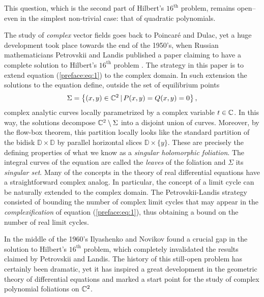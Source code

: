 \documentclass[phd,tocprelim]{cornell}
\begin{document}
\noindent This question, which is the second part of Hilbert's $16^{\text{th}}$ problem, remains open--even in the simplest non-trivial case: that of quadratic polynomials.

The study of \textit{complex} vector fields goes back to Poincar\'{e} and Dulac, yet a huge development took place towards the end of the 1950's, when Russian mathematicians Petrovskii and Landis published a paper claiming to have a complete solution to Hilbert's $16^{\text{th}}$ problem \cite{PetrovskiiLandis1957}. The strategy in this paper is to extend equation (\ref{preface:eq:1}) to the complex domain. In such extension the solutions to the equation define, outside the set of equilibrium points
 \[ \Sigma = \left\{{(x,y)\in\mathbb{C}^2}\,\vert\,{P(x,y)=Q(x,y)=0}\right\}, \]
complex analytic curves locally parametrized by a complex variable $t\in\mathbb{C}$. In this way, the solutions decompose $\mathbb{C}^2\setminus\Sigma$ into a disjoint union of curves. Moreover, by the flow-box theorem, this partition locally looks like the standard partition of the bidisk $\mathbb{D}\times\mathbb{D}$ by parallel horizontal slices $\mathbb{D}\times\{y\}$. These are precisely the defining properties of what we know as a \textit{singular holomorphic foliation}. The integral curves of the equation are called the \textit{leaves} of the foliation and $\Sigma$ its \textit{singular set}. Many of the concepts in the theory of real differential equations have a straightforward complex analog. In particular, the concept of a limit cycle can be naturally extended to the complex domain. The Petrovskii-Landis strategy consisted of bounding the number of complex limit cycles that may appear in the \textit{complexification} of equation (\ref{preface:eq:1}), thus obtaining a bound on the number of real limit cycles. 

In the middle of the 1960's Ilyashenko and Novikov found a crucial gap in the solution to Hilbert's $16^{\text{th}}$ problem, which completely invalidated the results claimed by Petrovskii and Landis. The history of this still-open problem has certainly been dramatic, yet it has inspired a great development in the geometric theory of differential equations and marked a start point for the study of complex polynomial foliations on $\mathbb{C}^2$.
\end{document}

